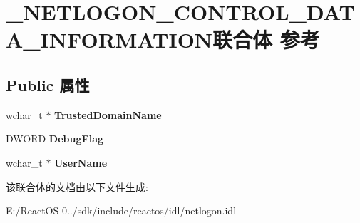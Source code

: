 \hypertarget{union___n_e_t_l_o_g_o_n___c_o_n_t_r_o_l___d_a_t_a___i_n_f_o_r_m_a_t_i_o_n}{}\section{\+\_\+\+N\+E\+T\+L\+O\+G\+O\+N\+\_\+\+C\+O\+N\+T\+R\+O\+L\+\_\+\+D\+A\+T\+A\+\_\+\+I\+N\+F\+O\+R\+M\+A\+T\+I\+O\+N联合体 参考}
\label{union___n_e_t_l_o_g_o_n___c_o_n_t_r_o_l___d_a_t_a___i_n_f_o_r_m_a_t_i_o_n}
\subsection*{Public 属性}
\begin{DoxyCompactItemize}
\item 
\mbox{\label{union___n_e_t_l_o_g_o_n___c_o_n_t_r_o_l___d_a_t_a___i_n_f_o_r_m_a_t_i_o_n_aec372197103b9a9453d9e0b0eeec6bea}} 
wchar\+\_\+t $\ast$ {\bfseries Trusted\+Domain\+Name}
\item 
\mbox{\label{union___n_e_t_l_o_g_o_n___c_o_n_t_r_o_l___d_a_t_a___i_n_f_o_r_m_a_t_i_o_n_a06a2fd2ff1444e4afe85a6f6a0e115c9}} 
D\+W\+O\+RD {\bfseries Debug\+Flag}
\item 
\mbox{\label{union___n_e_t_l_o_g_o_n___c_o_n_t_r_o_l___d_a_t_a___i_n_f_o_r_m_a_t_i_o_n_a333aed8517952528b269c5ce21938491}} 
wchar\+\_\+t $\ast$ {\bfseries User\+Name}
\end{DoxyCompactItemize}


该联合体的文档由以下文件生成\+:\begin{DoxyCompactItemize}
\item 
E\+:/\+React\+O\+S-\/0../sdk/include/reactos/idl/netlogon.\+idl\end{DoxyCompactItemize}
